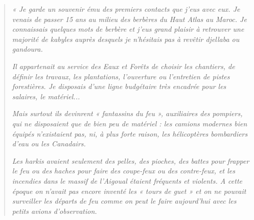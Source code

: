 \begin{quote}
\textit{« Je garde un souvenir ému des premiers contacts que j’eus avec eux. Je venais de
passer 15 ans au milieu des berbères du Haut Atlas au Maroc. Je connaissais
quelques mots de berbère et j’eus grand plaisir à retrouver une majorité de kabyles
auprès desquels je n’hésitais pas à revêtir djellaba ou gandoura.}

\textit{Il appartenait au service des Eaux et Forêts de choisir les chantiers, de définir les
travaux, les plantations, l’ouverture ou l’entretien de pistes forestières. Je disposais
d’une ligne budgétaire très encadrée pour les salaires, le matériel...}

\textit{Mais surtout ils devinrent « fantassins du feu », auxiliaires des pompiers, qui ne
disposaient que de bien peu de matériel : les camions modernes bien équipés
n’existaient pas, ni, à plus forte raison, les hélicoptères bombardiers d’eau ou les
Canadairs.}

\textit{Les harkis avaient seulement des pelles, des pioches, des battes pour frapper le feu
ou des haches pour faire des coupe-feux ou des contre-feux, et les incendies dans le
massif de l’Aigoual étaient fréquents et violents. A cette époque on n’avait pas
encore inventé les « tours de guet » et on ne pouvait surveiller les départs de feu
comme on peut le faire aujourd’hui avec les petits avions d’observation.}
\end{quote}
